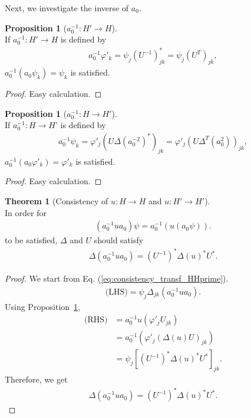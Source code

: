 \documentclass{article}
\theoremstyle{definition}
\newtheorem{prop}[dfn]{Proposition}
\newtheorem{thm}[dfn]{Theorem}
\begin{document}
Next, we investigate the inverse of $a_0$. 

\begin{prop}[$a_0^{-1} : H' \to H$]\label{prop:a01_Hprime_H}~\\
  If $a_0^{-1} : H' \to H$ is defined by
  \begin{align}
    a_0^{-1} \varphi'_k = \psi_j (U^{-1})^*_{jk} = \psi_j (U^{T})_{jk}, 
    \label{eq:inversea0_varphi}
  \end{align}
  $a_0^{-1} (a_0 \psi_k) = \psi_k$ is satisfied.
\end{prop}
\begin{proof}
  Easy calculation.
\end{proof}

\begin{prop}[$a_0^{-1} : H \to H'$]\label{prop:a01_H_Hprime}~\\
  If $a_0^{-1} : H \to H$' is defined by
  \begin{align}
    a_0^{-1} \psi_k = \varphi'_j (U \Delta(a_0^{-2})^*)_{jk} = \varphi'_j (U \Delta^T(a_0^{2}))_{jk}, 
    \label{eq:inversea0_varphi_HHprime}
  \end{align}
  $a_0^{-1} (a_0 \varphi'_k) = \varphi'_k$ is satisfied.
\end{prop}
\begin{proof}
  Easy calculation.
\end{proof}

\begin{thm}[Consistency of $u: H\to H$ and $u: H'\to H'$]\label{thm:Consistency_HHprime}~\\
  In order for 
  \begin{align}
    (a_0^{-1} u a_0 ) \psi = a_0^{-1}(u (a_0 \psi)).
    \label{eq:consistency_transf_HHprime}
  \end{align}
  to be satisfied, $\Delta$ and $U$ should satisfy 
  \begin{align}
    \Delta(a_0^{-1} u a_0) = (U^{-1})^* \Delta(u)^* U^*.
    \label{eq:Delta_am1ua}
  \end{align}
\end{thm}
\begin{proof}
  We start from Eq. (\ref{eq:consistency_transf_HHprime}).
  \begin{align}
    \text{(LHS)} = \psi_j \Delta_{jk}(a_0^{-1} u a_0).
  \end{align}
  Using Proposition~\ref{prop:a01_Hprime_H},
  \begin{align}
    \text{(RHS)} &= 
    a_0^{-1} u (\varphi'_j U_{jk}) 
    \nonumber
    \\&
    = a_0^{-1} (\varphi'_j (\Delta(u)U)_{jk})
    \nonumber
    \\&=
    \psi_j [(U^{-1})^* \Delta(u)^* U^*]_{jk}.
  \end{align}
  Therefore, we get
  \begin{align}
    \Delta(a_0^{-1} u a_0) = (U^{-1})^* \Delta(u)^* U^*.
  \end{align}
\end{proof}
\end{document}
